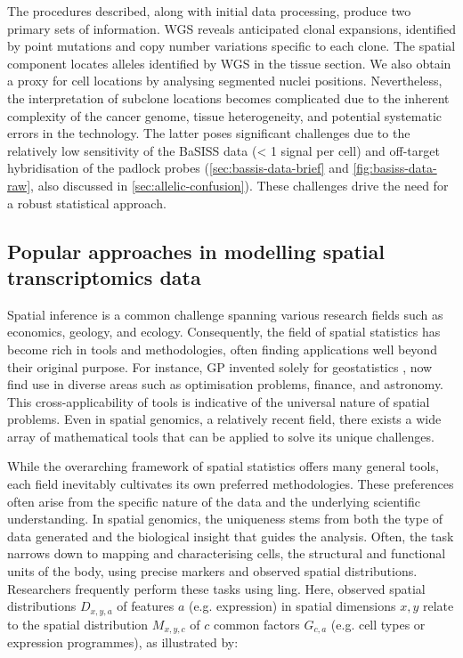 The procedures described, along with initial data processing, produce two primary sets of information. \ac{WGS} reveals anticipated clonal expansions, identified by point mutations and copy number variations specific to each clone. The spatial component locates alleles identified by \ac{WGS} in the tissue section. We also obtain a proxy for cell locations by analysing segmented nuclei positions. Nevertheless, the interpretation of subclone locations becomes complicated due to the inherent complexity of the cancer genome, tissue heterogeneity, and potential systematic errors in the technology. The latter poses significant challenges due to the relatively low sensitivity of the \ac{BaSISS} data (< 1 signal per cell) and off-target hybridisation of the padlock probes (\cref{sec:bassis-data-brief} and \cref{fig:basiss-data-raw}, also discussed in \cref{sec:allelic-confusion}). These challenges drive the need for a robust statistical approach.

\subsection{Popular approaches in modelling spatial transcriptomics data}
\label{sec:basiss-popular}
Spatial inference is a common challenge spanning various research fields such as economics, geology, and ecology. Consequently, the field of spatial statistics has become rich in tools and methodologies, often finding applications well beyond their original purpose. For instance, \acl{GP} invented solely for geostatistics \parencite{Krige1951-mt}, now find use in diverse areas such as optimisation problems, finance, and astronomy. This cross-applicability of tools is indicative of the universal nature of spatial problems. Even in spatial genomics, a relatively recent field, there exists a wide array of mathematical tools that can be applied to solve its unique challenges.
    
While the overarching framework of spatial statistics offers many general tools, each field inevitably cultivates its own preferred methodologies. These preferences often arise from the specific nature of the data and the underlying scientific understanding. In spatial genomics, the uniqueness stems from both the type of data generated and the biological insight that guides the analysis. Often, the task narrows down to mapping and characterising cells, the structural and functional units of the body, using precise markers and observed spatial distributions. Researchers frequently perform these tasks using ling. Here, observed spatial distributions $D_{x,y,a}$ of features $a$ (e.g. expression) in spatial dimensions $x, y$ relate to the spatial distribution $M_{x,y,c}$ of $c$ common factors $G_{c,a}$ (e.g. cell types or expression programmes), as illustrated by:

